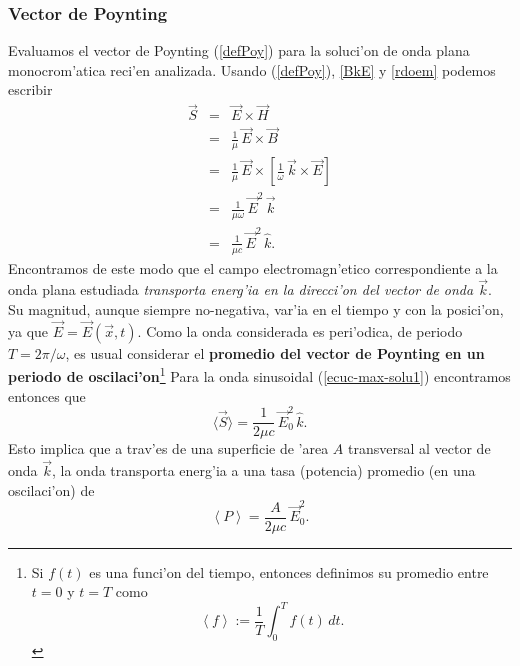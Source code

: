 \subsubsection{Vector de Poynting}
Evaluamos el vector de Poynting (\ref{defPoy}) para la soluci'on de onda plana monocrom'atica reci'en analizada. Usando (\ref{defPoy}), \eqref{BkE} y \eqref{rdoem} podemos escribir
\begin{eqnarray}
 \vec{S}&=&\vec{E}\times\vec{H} \\
&=&\frac{1}{\mu}\,\vec{E}\times\vec{B} \\
&=&\frac{1}{\mu}\,\vec{E}\times\left[\frac{1}{\omega}\,\vec{k}\times\vec{E}
\right] \\
&=&\frac{1}{\mu\omega}\,\vec{E}^2\,\vec{k}\\
&=&\frac{1}{\mu c}\,\vec{E}^2\,\hat{k}. \label{Sop}
\end{eqnarray}
Encontramos de este modo que el campo electromagn'etico correspondiente a la onda plana estudiada \textit{transporta energ'ia en la direcci'on del vector de onda $\vec{k}$}. Su magnitud, aunque siempre no-negativa, var'ia en el tiempo y con la posici'on, ya que $\vec{E}=\vec{E}(\vec{x},t)$. Como la onda considerada es peri'odica, de periodo $T=2\pi/\omega$, es usual considerar el \textbf{promedio del vector de Poynting en un periodo de oscilaci'on}\footnote{Si $f(t)$ es una funci'on del tiempo, entonces definimos su promedio entre $t=0$ y $t=T$ como 
\begin{equation}
\left<f\right>:=\frac{1}{T}\int_0^Tf(t)\,dt.
\end{equation}}
Para la onda sinusoidal (\ref{ecuc-max-solu1}) encontramos entonces que
\begin{equation}\label{Sprom}
\langle\vec{S}\rangle=\frac{1}{2\mu c}\,\vec{E}_0^2\,\hat{k}.
\end{equation}
Esto implica que a trav'es de una superficie de 'area $A$ transversal al vector de onda $\vec{k}$, la onda transporta energ'ia a una tasa (potencia) promedio (en una oscilaci'on) de 
\begin{equation}
 \left<P\right>=\frac{A}{2\mu c}\,\vec{E}_0^2.
\end{equation}

